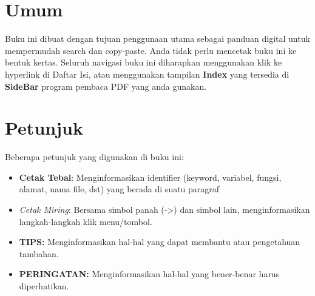 \documentclass[12pt]{book}
\begin{document}
	\section{Umum}
	Buku ini dibuat dengan tujuan penggunaan utama sebagai panduan digital untuk mempermudah search dan copy-paste.
	Anda tidak perlu mencetak buku ini ke bentuk kertas.
	Seluruh navigasi buku ini diharapkan menggunakan klik ke hyperlink di Daftar Isi,
	atau menggunakan tampilan \textbf{Index} yang tersedia di \textbf{SideBar} program pembaca PDF yang anda gunakan.

	\section{Petunjuk}
	Beberapa petunjuk yang digunakan di buku ini:
	\begin{itemize}
		\item \textbf{Cetak Tebal}: Menginformasikan identifier (keyword, variabel, fungsi, alamat, nama file, dst) yang berada di suatu paragraf
		\item \textit{Cetak Miring}: Bersama simbol panah (->) dan simbol lain, menginformasikan langkah-langkah klik menu/tombol.
		\item \textbf{TIPS:} Menginformasikan hal-hal yang dapat membantu atau pengetahuan tambahan.
		\item \textbf{PERINGATAN:} Menginformasikan hal-hal yang bener-benar harus diperhatikan.
	\end{itemize}
\end{document}
